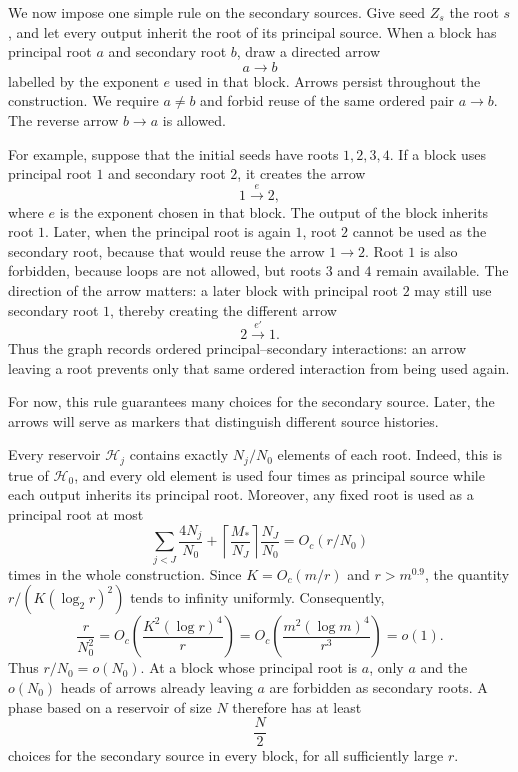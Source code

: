 \documentclass{article}
\theoremstyle{definition}
\begin{document}
We now impose one simple rule on the secondary sources.  Give seed $Z_s$ the
root $s$, and let every output inherit the root of its principal source.  When
a block has principal root $a$ and secondary root $b$, draw a directed arrow
$$
 a\longrightarrow b
$$
labelled by the exponent $e$ used in that block.  Arrows persist throughout
the construction.  We require $a\neq b$ and forbid reuse of the same ordered
pair $a\to b$.  The reverse arrow $b\to a$ is allowed.

For example, suppose that the initial seeds have roots $1,2,3,4$.  If a
block uses principal root $1$ and secondary root $2$, it creates the arrow
$$
 1\xrightarrow{e}2,
$$
where $e$ is the exponent chosen in that block.  The output of the block
inherits root $1$.  Later, when the principal root is again $1$, root $2$
cannot be used as the secondary root, because that would reuse the arrow
$1\to2$.  Root $1$ is also forbidden, because loops are not allowed, but
roots $3$ and $4$ remain available.
The direction of the arrow matters:  a later block with principal root $2$
may still use secondary root $1$, thereby creating the different arrow
$$
 2\xrightarrow{e'}1.
$$
Thus the graph records ordered principal--secondary interactions: an arrow
leaving a root prevents only that same ordered interaction from being used
again.

For now, this rule guarantees many choices for the secondary source.  Later,
the arrows will serve as markers that distinguish different source histories.

Every reservoir $\mathcal H_j$ contains exactly $N_j/N_0$ elements of each
root.  Indeed, this is true of $\mathcal H_0$, and every old element is used
four times as principal source while each output inherits its principal
root.  Moreover, any fixed root is used as a principal root at most
$$
 \sum_{j<J}\frac{4N_j}{N_0}
 +\left\lceil\frac{M_*}{N_J}\right\rceil\frac{N_J}{N_0}
 =O_c(r/N_0)
$$
times in the whole construction.  Since $K=O_c(m/r)$ and $r>m^{0.9}$, the quantity
$r/(K(\log_2r)^2)$ tends to infinity uniformly. Consequently,
$$
\frac{r}{N_0^2}
=O_c\left(\frac{K^2(\log r)^4}{r}\right)
=O_c\left(\frac{m^2(\log m)^4}{r^3}\right)
=o(1).
$$
Thus $r/N_0=o(N_0)$. At a block whose principal root is $a$,
only $a$ and the $o(N_0)$ heads of arrows already leaving $a$
are forbidden as secondary roots. A phase based on a reservoir of size $N$
therefore has at least
\begin{equation}
 \frac N2
 \label{eq:F-new-secondary-count}
\end{equation}
choices for the secondary source in every block, for all sufficiently large
$r$.
\end{document}
